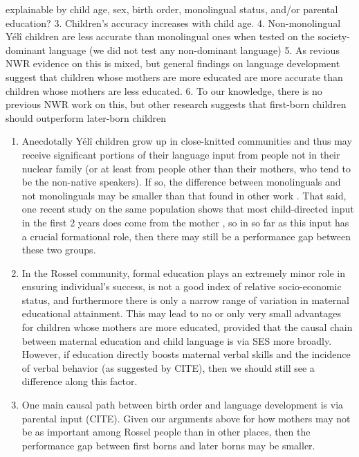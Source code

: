 \documentclass[english,,man]{apa6}
\providecommand{\tightlist}{%
  \setlength{\itemsep}{0pt}\setlength{\parskip}{0pt}}
\begin{document}
explainable by child age, sex, birth order, monolingual status, and/or parental education?
3. Children's accuracy increases with child age.
4. Non-monolingual Yélî children are less accurate than monolingual ones when tested on the society-dominant language (we did not test any non-dominant language)
5. As revious NWR evidence on this is mixed, but general findings on language development suggest that children whose mothers are more educated are more accurate than children whose mothers are less educated.
6. To our knowledge, there is no previous NWR work on this, but other research suggests that first-born children should outperform later-born children

\begin{enumerate}
\def\labelenumi{\arabic{enumi}.}
\setcounter{enumi}{3}
\tightlist
\item
  Anecdotally Yélî children grow up in close-knitted communities and thus may receive significant portions of their language input from people not in their nuclear family
  (or at least from people other than their mothers, who tend to be the non-native speakers). If so, the difference between monolinguals and not monolinguals may be smaller than that found in other work
  . That said, one recent study on the same population shows that most child-directed input in the first 2 years does come from the mother
  , so in so far as this input has a crucial formational role, then there may still be a performance gap between these two groups.
\item
  In the Rossel community, formal education plays an extremely minor role in ensuring individual's success, is not a good index of relative socio-economic status, and furthermore there is only a narrow range of variation in maternal educational attainment. This may lead to no or only very small advantages for children whose mothers are more educated, provided that the causal chain between maternal education and child language is via SES more broadly. However, if education directly boosts maternal verbal skills and the incidence of verbal behavior (as suggested by CITE), then we should still see a difference along this factor.
\item
  One main causal path between birth order and language development is via parental input (CITE). Given our arguments above for how mothers may not be as important among Rossel people than in other places, then the performance gap between first borns and later borns may be smaller.
\end{enumerate}
\end{document}
